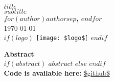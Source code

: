 \vspace{6em}
\begin{center}
    {\Large \textbf{$title$}} \\[1em]
    {\large $subtitle$} \\[1em]
    \textbf{$for(author)$$author$$sep$, $endfor$} \\[1em]
    \today \\[1em]
    $if(logo)$
    \texttt{[image: \$logo\$]}
    $endif$
\end{center}
\textbf{Abstract} \\[1em]
$if(abstract)$
$abstract$
$else$
\lipsum[1] %
$endif$
\vspace{2em} \\[2em]
\textbf{Code is available here: } \url{$github$} \\[1em]

\newpage
